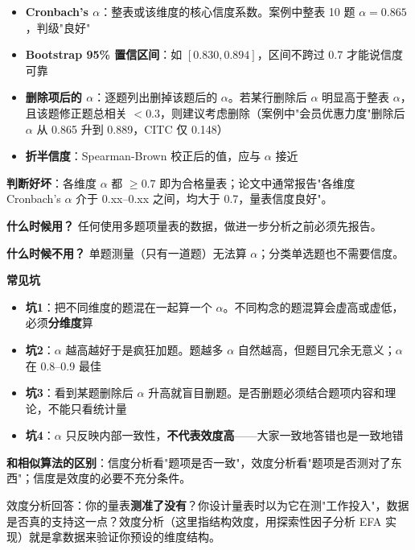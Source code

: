 \begin{algoresult}
\begin{itemize}
    \item \textbf{Cronbach's $\alpha$}：整表或该维度的核心信度系数。案例中整表 10 题 $\alpha=0.865$，判级"良好"
    \item \textbf{Bootstrap 95\% 置信区间}：如 $[0.830, 0.894]$，区间不跨过 0.7 才能说信度可靠
    \item \textbf{删除项后的 $\alpha$}：逐题列出删掉该题后的 $\alpha$。若某行删除后 $\alpha$ 明显高于整表 $\alpha$，且该题修正题总相关 $<0.3$，则建议考虑删除（案例中"会员优惠力度"删除后 $\alpha$ 从 0.865 升到 0.889，CITC 仅 0.148）
    \item \textbf{折半信度}：Spearman-Brown 校正后的值，应与 $\alpha$ 接近
\end{itemize}

\textbf{判断好坏}：各维度 $\alpha$ 都 $\geq 0.7$ 即为合格量表；论文中通常报告"各维度 Cronbach's $\alpha$ 介于 0.xx--0.xx 之间，均大于 0.7，量表信度良好"。
\end{algoresult}

\begin{algonotes}
\textbf{什么时候用？} 任何使用多题项量表的数据，做进一步分析之前必须先报告。

\textbf{什么时候不用？} 单题测量（只有一道题）无法算 $\alpha$；分类单选题也不需要信度。

\textbf{常见坑}
\begin{itemize}
    \item \textbf{坑1}：把不同维度的题混在一起算一个 $\alpha$。不同构念的题混算会虚高或虚低，必须\textbf{分维度}算
    \item \textbf{坑2}：$\alpha$ 越高越好于是疯狂加题。题越多 $\alpha$ 自然越高，但题目冗余无意义；$\alpha$ 在 0.8--0.9 最佳
    \item \textbf{坑3}：看到某题删除后 $\alpha$ 升高就盲目删题。是否删题必须结合题项内容和理论，不能只看统计量
    \item \textbf{坑4}：$\alpha$ 只反映内部一致性，\textbf{不代表效度高}——大家一致地答错也是一致地错
\end{itemize}

\textbf{和相似算法的区别}：信度分析看"题项是否一致"，效度分析看"题项是否测对了东西"；信度是效度的必要不充分条件。
\end{algonotes}


\begin{algointro}
效度分析回答：你的量表\textbf{测准了没有}？你设计量表时以为它在测"工作投入"，数据是否真的支持这一点？效度分析（这里指结构效度，用探索性因子分析 EFA 实现）就是拿数据来验证你预设的维度结构。
\end{algointro}

